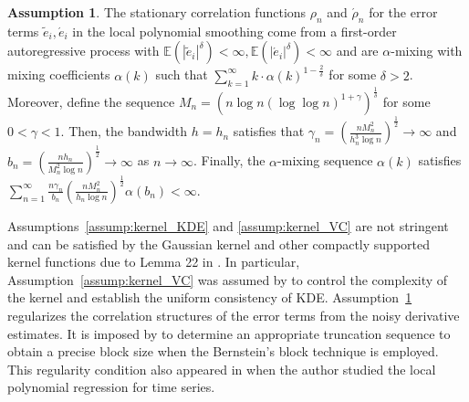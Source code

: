 \documentclass{uwstat572}
\theoremstyle{definition}
\newtheorem{assump}{Assumption}
\renewcommand{\tilde}{\widetilde}
\theoremstyle{theorem}
\begin{document}
\begin{assump}
\label{assump:mixing}
The stationary correlation functions $\rho_n$ and $\acute{\rho}_n$ for the error terms $\tilde{e}_i,\acute{e}_i$ in the local polynomial smoothing come from a first-order autoregressive process with $\mathbb{E}\left(|\tilde{e}_i|^{\delta}\right) <\infty, \mathbb{E}\left(|\acute{e}_i|^{\delta}\right) <\infty$ and are $\alpha$-mixing with mixing coefficients $\alpha(k)$ such that $\sum_{k=1}^{\infty} k \cdot \alpha(k)^{1-\frac{2}{\delta}}$ for some $\delta >2$. Moreover, define the sequence $M_n=\left(n\log n (\log\log n)^{1+\gamma}\right)^{\frac{1}{\delta}}$ for some $0<\gamma <1$. Then, the bandwidth $h=h_n$ satisfies that $\gamma_n=\left(\frac{nM_n^2}{h_n^3 \log n}\right)^{\frac{1}{2}} \to \infty$ and $b_n=\left(\frac{nh_n}{M_n^2 \log n}\right)^{\frac{1}{2}} \to \infty$ as $n\to\infty$. Finally, the $\alpha$-mixing sequence $\alpha(k)$ satisfies $\sum_{n=1}^{\infty} \frac{n\gamma_n}{b_n}\left(\frac{nM_n^2}{h_n\log n}\right)^{\frac{1}{2}} \alpha(b_n) <\infty$.
\end{assump}

Assumptions~\ref{assump:kernel_KDE} and \ref{assump:kernel_VC} are not stringent and can be satisfied by the Gaussian kernel and other compactly supported kernel functions due to Lemma 22 in \cite{nolan1987uprocesses}. In particular, Assumption~\ref{assump:kernel_VC} was assumed by \cite{gine2002rates,Einmahl2005uniform} to control the complexity of the kernel and establish the uniform consistency of KDE. Assumption~\ref{assump:mixing} regularizes the correlation structures of the error terms from the noisy derivative estimates. It is imposed by \cite{francisco2003uniform} to determine an appropriate truncation sequence to obtain a precise block size when the Bernstein's block technique is employed. This regularity condition also appeared in \cite{masry1996multivariate} when the author studied the local polynomial regression for time series. 
\end{document}
